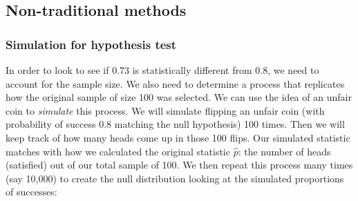 \documentclass[12pt,]{krantz}
\makeatletter
\newenvironment{Shaded}{\begin{snugshade}}{\end{snugshade}}
\newcommand{\KeywordTok}[1]{\textcolor[rgb]{0.27,0.27,0.27}{\textbf{#1}}}
\newcommand{\DataTypeTok}[1]{\textcolor[rgb]{0.27,0.27,0.27}{#1}}
\newcommand{\DecValTok}[1]{\textcolor[rgb]{0.06,0.06,0.06}{#1}}
\newcommand{\FloatTok}[1]{\textcolor[rgb]{0.06,0.06,0.06}{#1}}
\newcommand{\StringTok}[1]{\textcolor[rgb]{0.5,0.5,0.5}{#1}}
\newcommand{\OperatorTok}[1]{\textcolor[rgb]{0.43,0.43,0.43}{\textbf{#1}}}
\newcommand{\NormalTok}[1]{#1}
\newenvironment{kframe}{%
\medskip{}
\setlength{\fboxsep}{.8em}
 \def\at@end@of@kframe{}%
 \ifinner\ifhmode%
  \def\at@end@of@kframe{\end{minipage}}%
  \begin{minipage}{\columnwidth}%
 \fi\fi%
 \def\FrameCommand##1{\hskip\@totalleftmargin \hskip-\fboxsep
 \colorbox{shadecolor}{##1}\hskip-\fboxsep
     \hskip-\linewidth \hskip-\@totalleftmargin \hskip\columnwidth}%
 \MakeFramed {\advance\hsize-\width
   \@totalleftmargin\z@ \linewidth\hsize
   \@setminipage}}%
 {\par\unskip\endMakeFramed%
 \at@end@of@kframe}
\renewenvironment{Shaded}{\begin{kframe}}{\end{kframe}}
\makeatother
\begin{document}
\subsection{Non-traditional methods}\label{non-traditional-methods-1}

\subsubsection*{Simulation for hypothesis
test}\label{simulation-for-hypothesis-test}


In order to look to see if 0.73 is statistically different from 0.8, we
need to account for the sample size. We also need to determine a process
that replicates how the original sample of size 100 was selected. We can
use the idea of an unfair coin to \emph{simulate} this process. We will
simulate flipping an unfair coin (with probability of success 0.8
matching the null hypothesis) 100 times. Then we will keep track of how
many heads come up in those 100 flips. Our simulated statistic matches
with how we calculated the original statistic \(\hat{p}\): the number of
heads (satisfied) out of our total sample of 100. We then repeat this
process many times (say 10,000) to create the null distribution looking
at the simulated proportions of successes:

\begin{Shaded}
\end{Shaded}

\begin{Shaded}
\end{Shaded}
\end{document}
